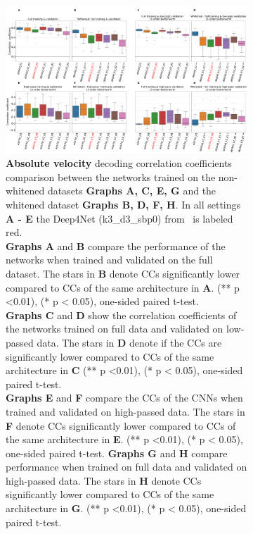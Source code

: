 \begin{figure}[!htbp]\ContinuedFloat
\begin{subfigure}[b]{\textwidth}
   \includegraphics[width=1\linewidth]{img/ch4/absVel-pw-vs-non-pw-performance}
   \caption{\textbf{Absolute velocity} decoding correlation coefficients comparison between the networks trained on the non-whitened datasets \textbf{Graphs A, C, E, G} and the whitened dataset \textbf{Graphs B, D, F, H}.
   In all settings \textbf{A - E} the Deep4Net (k3\_d3\_sbp0) from~\cite{Hammer-2021} is labeled red.
   \\ \textbf{Graphs A} and \textbf{B} compare the performance of the networks when trained and validated on the full dataset.
   The stars in \textbf{B} denote CCs significantly lower compared to CCs of the same architecture in \textbf{A}. (** p <0.01), (* p < 0.05), one-sided paired t-test.
   \\\textbf{Graphs C} and \textbf{D} show the correlation coefficients of the networks trained on full data and validated on low-passed data.
   The stars in \textbf{D} denote if the CCs are significantly lower compared to CCs of the same architecture in \textbf{C} (** p <0.01), (* p < 0.05), one-sided paired t-test.
   \\\textbf{Graphs E} and \textbf{F} compare the CCs of the CNNs when trained and validated on high-passed data.
   The stars in \textbf{F} denote CCs significantly lower compared to CCs of the same architecture in \textbf{E}. (** p <0.01), (* p < 0.05), one-sided paired t-test.
   \textbf{Graphs G} and \textbf{H} compare performance when trained on full data and validated on high-passed data.
   The stars in \textbf{H} denote CCs significantly lower compared to CCs of the same architecture in \textbf{G}. (** p <0.01), (* p < 0.05), one-sided paired t-test.}
\end{subfigure}\label{fig:absVel-pw-performance}
\caption[Spectral whitening - performance comparison]{}
\end{figure}\label{fig:pw-performance}

